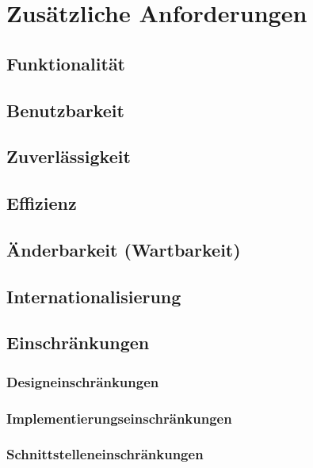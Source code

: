 \documentclass[11pt,ngerman]{article}
\begin{document}
    \section{Zusätzliche Anforderungen}

    \subsection{Funktionalität}

    \subsection{Benutzbarkeit}

    \subsection{Zuverlässigkeit}

    \subsection{Effizienz}

    \subsection{Änderbarkeit (Wartbarkeit)}

    \subsection{Internationalisierung}

    \subsection{Einschränkungen}

    \subsubsection{Designeinschränkungen}

    \subsubsection{Implementierungseinschränkungen}

    \subsubsection{Schnittstelleneinschränkungen}
\end{document}
